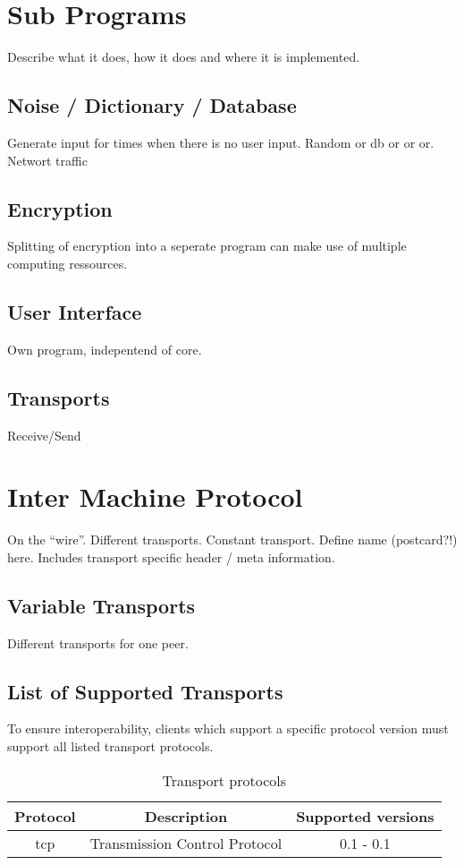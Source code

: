 \documentclass[12pt,a4paper]{article}
\begin{document}
\section{Sub Programs}
Describe what it does, how it does and where it is implemented.
\subsection{Noise / Dictionary / Database}
Generate input for times when there is no user input.
Random or db or or or.
Networt traffic
\subsection{Encryption}
Splitting of encryption into a seperate program can make use of
multiple computing ressources.
\subsection{User Interface}
Own program, indepentend of core.
\subsection{Transports}
Receive/Send

\section{Inter Machine Protocol}
On the "`wire"'. Different transports. Constant transport.
Define name (postcard?!) here. Includes transport specific
header / meta information.

\subsection{Variable Transports}
Different transports for one peer.
\subsection{List of Supported Transports}
To ensure interoperability, clients which support a specific
protocol version must support all listed transport protocols.
\begin{longtable}{|c|c|c|}
\caption{Transport protocols}\\
\hline
\textbf{Protocol} & \textbf{Description} & \textbf{Supported versions}\\
\hline
tcp & Transmission Control Protocol & 0.1 - 0.1\\
\hline
\end{longtable}
\end{document}

